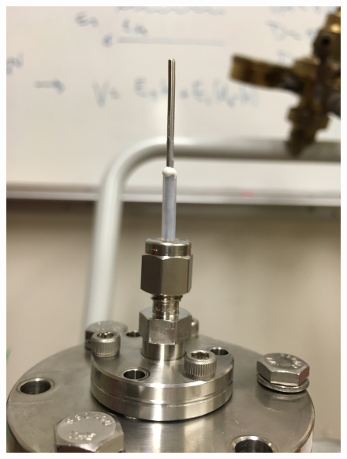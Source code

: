 \begin{figure}[htbp]
\begin{minipage}{0.47\textwidth}
    \includegraphics[width=\linewidth, angle=270]{figures/testbed/ft5_2.jpg}
    \end{minipage}

    \vspace*{1cm} %


\end{figure}
